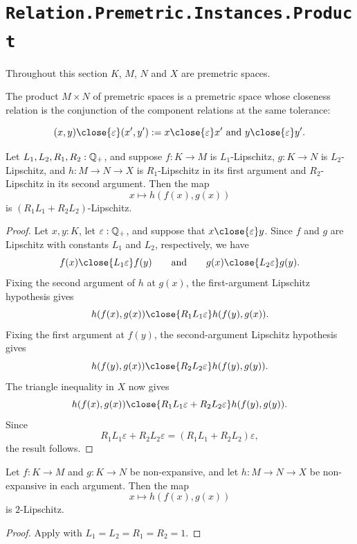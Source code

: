 \section{\texttt{Relation.Premetric.Instances.Product}}

Throughout this section $K$, $M$, $N$ and $X$ are premetric spaces.

\begin{definition}
  \label{timesPrSp}
  The product $M \times N$ of premetric spaces is a premetric space whose closeness relation is the conjunction of the component relations at the same tolerance:

  \[
    (x, y) \close{\varepsilon} (x', y') := x \close{\varepsilon} x' \text{ and } y \close{\varepsilon} y'.
  \]
\end{definition}

\begin{lemma}
  \label{composeIsLipschitzWith2}
  Let $L_1, L_2, R_1, R_2 : \mathbb{Q}_{+}$, and suppose $f \colon K \to M$ is $L_1$-Lipschitz, $g \colon K \to N$ is $L_2$-Lipschitz, and $h \colon M \to N \to X$ is $R_1$-Lipschitz in its first argument and $R_2$-Lipschitz in its second argument. Then the map
  \[
    x \mapsto h(f(x), g(x))
  \]
  is $(R_1L_1 + R_2L_2)$-Lipschitz.
\end{lemma}
\begin{proof}
  Let $x, y : K$, let $\varepsilon : \mathbb{Q}_{+}$, and suppose that $x \close{\varepsilon} y$. Since $f$ and $g$ are Lipschitz with constants $L_1$ and $L_2$, respectively, we have
  \[
    f(x) \close{L_1\varepsilon} f(y)
    \qquad\text{and}\qquad
    g(x) \close{L_2\varepsilon} g(y).
  \]
  Fixing the second argument of $h$ at $g(x)$, the first-argument Lipschitz hypothesis gives
  \[
    h(f(x),g(x)) \close{R_1L_1\varepsilon} h(f(y),g(x)).
  \]
  Fixing the first argument at $f(y)$, the second-argument Lipschitz hypothesis gives
  \[
    h(f(y),g(x)) \close{R_2L_2\varepsilon} h(f(y),g(y)).
  \]
  The triangle inequality in $X$ now gives
  \[
    h(f(x),g(x)) \close{R_1L_1\varepsilon + R_2L_2\varepsilon} h(f(y),g(y)).
  \]
  Since
  \[
    R_1L_1\varepsilon + R_2L_2\varepsilon = (R_1L_1 + R_2L_2)\varepsilon,
  \]
  the result follows.
\end{proof}

\begin{corollary}
  \label{composeNE2}
  Let $f \colon K \to M$ and $g \colon K \to N$ be non-expansive, and let $h \colon M \to N \to X$ be non-expansive in each argument. Then the map
  \[
    x \mapsto h(f(x), g(x))
  \]
  is $2$-Lipschitz.
\end{corollary}
\begin{proof}
  Apply  with $L_1 = L_2 = R_1 = R_2 = 1$.
\end{proof}

